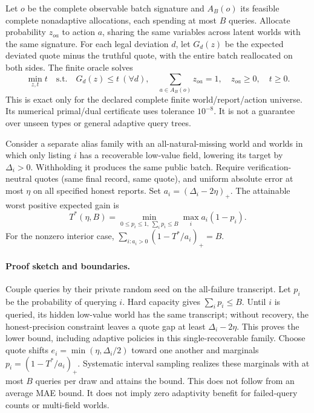 \documentclass[11pt]{article}
\begin{document}
Let $o$ be the complete observable batch signature and $A_B(o)$ its feasible
complete nonadaptive allocations, each spending at most $B$ queries. Allocate
probability $z_{oa}$ to action $a$, sharing the same variables across latent
worlds with the same signature. For each legal deviation $d$, let $G_d(z)$ be
the expected deviated quote minus the truthful quote, with the entire batch
reallocated on both sides. The finite oracle solves
\[
 \min_{z,t} t\quad\text{s.t.}\quad G_d(z)\le t\ (\forall d),\quad
 \sum_{a\in A_B(o)}z_{oa}=1,\quad z_{oa}\ge0,\quad t\ge0.
\]
This is exact only for the declared complete finite world/report/action universe.
Its numerical primal/dual certificate uses tolerance $10^{-8}$. It is not a
guarantee over unseen types or general adaptive query trees.

Consider a separate alias family with an all-natural-missing world and worlds
in which only listing $i$ has a recoverable low-value field, lowering its target
by $\Delta_i>0$. Withholding it produces the same public batch. Require
verification-neutral quotes (same final record, same quote), and uniform
absolute error at most $\eta$ on all specified honest reports. Set
$a_i=(\Delta_i-2\eta)_+$. The attainable worst positive expected gain is
\begin{equation}
T^*(\eta,B)=\min_{0\le p_i\le1,\ \sum_i p_i\le B}\max_i a_i(1-p_i).
\label{eq:frontier}
\end{equation}
For the nonzero interior case, $\sum_{i:a_i>0}(1-T^*/a_i)_+=B$.

\paragraph{Proof sketch and boundaries.}
Couple queries by their private random seed on the all-failure transcript.
Let $p_i$ be the probability of querying $i$. Hard capacity gives
$\sum_i p_i\le B$. Until $i$ is queried, its hidden low-value world has the same
transcript; without recovery, the honest-precision constraint leaves a quote
gap at least $\Delta_i-2\eta$. This proves the lower bound, including adaptive
policies in this single-recoverable family. Choose quote shifts
$e_i=\min(\eta,\Delta_i/2)$ toward one another and marginals
$p_i=(1-T^*/a_i)_+$. Systematic interval sampling realizes these marginals with
at most $B$ queries per draw and attains the bound. This does not follow from
an average MAE bound. It does not imply zero adaptivity benefit for failed-query
counts or multi-field worlds.
\end{document}
